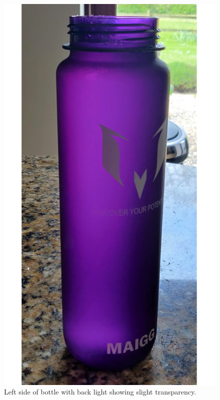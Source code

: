 \documentclass[notitlepage,12pt]{article}
\begin{document}
\begin{figure}[ht]
    \centering
    \begin{minipage}[b]{0.3\textwidth}
        \includegraphics[width=\textwidth]{reference/bottle_left.jpg}
        \caption{Left side of bottle with back light showing slight transparency.}
        \label{fig:left}
    \end{minipage}
    \hfill
    \begin{minipage}[b]{0.3\textwidth}

\end{minipage}
\end{figure}
\end{document}
